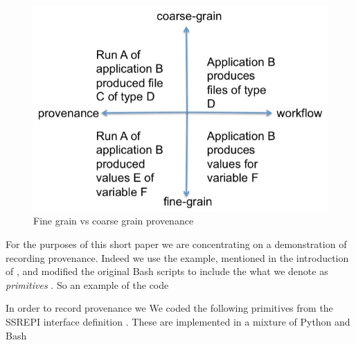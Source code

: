 \documentclass[runningheads]{llncs}
\begin{document}
\begin{figure}
\includegraphics[width=\textwidth]{img/fine-grain-vs-coarse-grain.jpeg}
\caption{Fine grain vs coarse grain provenance} \label{fig:finegrain}
\end{figure}

For the purposes of this short paper we are concentrating on a
demonstration of recording provenance. Indeed we use the example,
mentioned in the introduction of \cite{}, and modified the original Bash \cite{} scripts to include the what we denote as \textit{primitives} . So an example of the code 

In order to record provenance we 
We coded the following primitives from
the SSREPI interface definition \cite{}. These are implemented in a mixture of Python \cite{} and Bash \cite{}
\end{document}
